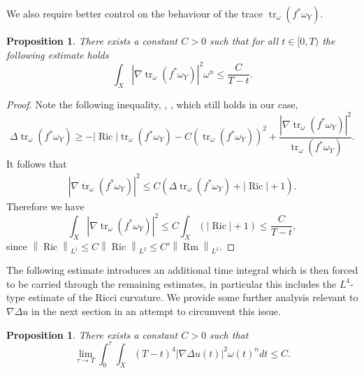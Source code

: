 \documentclass[12pt]{article}
\newtheorem{proposition}[theorem]{Proposition}
\numberwithin{equation}{section}
\DeclareMathOperator{\Ric}{Ric}
\DeclareMathOperator{\Rm}{Rm}
\DeclareMathOperator{\tr}{tr}
\newcommand{\norm}[1]{\left\|#1\right\|}
\begin{document}
\noindent We also require better control on the behaviour of the trace $\tr_\omega(f^*\omega_Y)$.

\begin{proposition}\label{gradient_trace_bound}
There exists a constant $C > 0$ such that for all $t \in [0,T)$ the following estimate holds
\begin{equation*}
    \int_X |\nabla \tr_\omega(f^* \omega_Y)|^2 \omega^n \leq \frac{C}{T-t}.
\end{equation*}
\end{proposition}

\begin{proof}
Note the following inequality, \cite[Eq. 3.19]{TZ15}, \cite{ST07}, which still holds in our case,
\begin{equation*}
    \Delta \tr_\omega (f^*\omega_Y) \geq -|\Ric| \tr_\omega (f^* \omega_Y) - C (\tr_\omega (f^* \omega_Y))^2 + \frac{|\nabla \tr_\omega (f^*\omega_Y)|^2}{\tr_\omega (f^*\omega_Y)}.
\end{equation*}
It follows that
\begin{align}\label{lower_trace_bound}
    |\nabla \tr_\omega(f^*\omega_Y)|^2 \leq C(\Delta \tr_\omega (f^*\omega_Y) + |\Ric|+1).
\end{align}
Therefore we have
\begin{equation*}
    \int_X |\nabla \tr_\omega (f^*\omega_Y)|^2 \leq C\int_X (|\Ric|+1) \leq \frac{C}{T-t},
\end{equation*}
since $\norm{\Ric}_{L^1} \leq C\norm{\Ric}_{L^2} \leq C' \norm{\Rm}_{L^2}$.
\end{proof}

\noindent The following estimate introduces an additional time integral which is then forced to be carried through the remaining estimates, in particular this includes the $L^4$-type estimate of the Ricci curvature. We provide some further analysis relevant to $\nabla \Delta u$ in the next section in an attempt to circumvent this issue.

\begin{proposition}
There exists a constant $C > 0$ such that
\begin{equation*}
    \lim_{\tau \to T} \int_0^\tau \int_X (T-t)^4 |\nabla \Delta u(t)|^2 \omega(t)^n dt \leq C.
\end{equation*}
\end{proposition}
\end{document}
